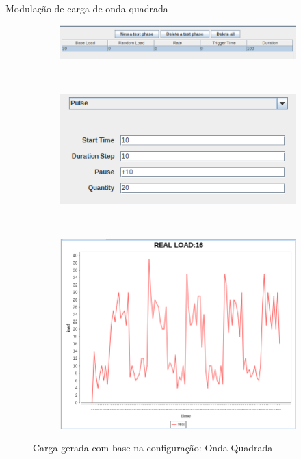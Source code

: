 \begin{frame}{Modulação de carga de onda quadrada}
	\begin{figure}[!htb]
		\begin{subfigure}{\linewidth}
			\centering
			\includegraphics[scale=0.35]{../monograph/images/condiguracao-carga-bench4q3.png}
			\label{fig:condiguracao-carga-bench4q3}
		\end{subfigure}\\
		\begin{subfigure}{\linewidth}
			\centering
			\includegraphics[scale=0.35]{../monograph/images/condiguracao-carga-modulada3.png}
			\label{fig:condiguracao-carga-modulada3}
		\end{subfigure}\\[1ex]
		\begin{subfigure}{\linewidth}
			\centering
			\includegraphics[scale=0.3]{../monograph/images/grafico-carga-modulada3.png}
			\label{fig:grafico-carga-modulada3}
		\end{subfigure}
		\caption{Carga gerada com base na configuração: Onda Quadrada}
		\label{fig:carga-modulada3}
	\end{figure}
\end{frame}